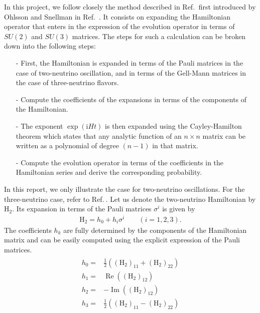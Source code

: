 \documentclass[twocolumn,secnumarabic,amssymb, nobibnotes, aps, prd,10pt]{revtex4-1}
\newcommand{\myref}[1]{Ref.$\:$\cite{#1}}
\begin{document}
In this project, we follow closely the method described in \myref{Bustamante:2019ggq} first 
introduced by Ohlsson and Snellman in Ref.~\cite{Ohlsson:1999xb, Ohlsson:1999um, Ohlsson:2001et}. 
It consists on expanding the Hamiltonian operator that enters in the expression of the evolution 
operator in terms of $SU(2)$ and $SU(3)$ matrices. The steps for such a calculation can be 
broken down into the following steps:
\begin{itemize}
\item[-] First, the Hamiltonian is expanded in terms of the Pauli matrices in the case of
two-neutrino oscillation, and in terms of the Gell-Mann matrices in the case of 
three-neutrino flavors.
\item[-] Compute the coefficients of the expansions in terms of the components of the
Hamiltonian.
\item[-] The exponent $\exp (\mathrm{i} H t)$ is then expanded using the Cayley-Hamilton theorem
which states that any analytic function of an $n \times n$ matrix can be written as a 
polynomial of degree $(n-1)$ in that matrix.
\item[-] Compute the evolution operator in terms of the coefficients in the Hamiltonian
series and derive the corresponding probability.
\end{itemize}
In this report, we only illustrate the case for two-neutrino oscillations. For the 
three-neutrino case, refer to \myref{Bustamante:2019ggq}. Let us denote the two-neutrino Hamiltonian
by $\mathrm{H}_2$. Its expansion in terms of the Pauli matrices $\sigma^i$ is given by
\begin{align}
\mathrm{H}_2 = h_0 + h_i \sigma^i \quad \quad (i=1,2,3).
\end{align}
The coefficients $h_k$ are fully determined by the components of the Hamiltonian matrix
and can be easily computed using the explicit expression of the Pauli matrices.
\begin{align}
\begin{array}{ll}
h_{0} =& \frac{1}{2}\left(\left(\mathrm{H}_{2}\right)_{11}+\left(\mathrm{H}_{2}\right)_{22}\right) \\
h_{1} =& \operatorname{Re}\left(\left(\mathrm{H}_{2}\right)_{12}\right) \\
h_{2} =& -\operatorname{Im}\left(\left(\mathrm{H}_{2}\right)_{12}\right) \\
h_{3} =& \frac{1}{2}\left(\left(\mathrm{H}_{2}\right)_{11}-\left(\mathrm{H}_{2}\right)_{22}\right)
\end{array}
\end{align}
\end{document}
